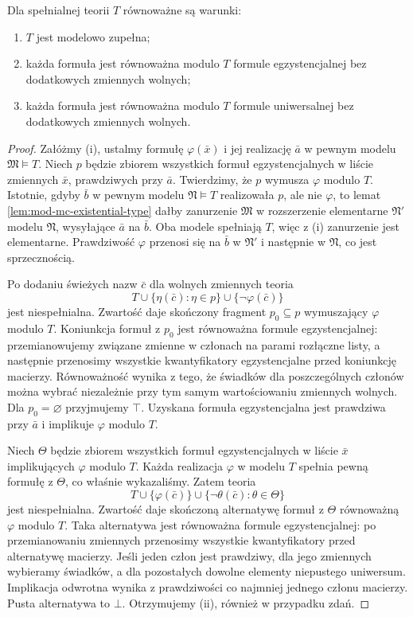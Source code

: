 \begin{twierdzenie}
\label{thm:mod-mc-existential-formulas}
Dla spełnialnej teorii $T$ równoważne są warunki:
\begin{enumerate}[label=(\roman*)]
\item $T$ jest modelowo zupełna;
\item każda formuła jest równoważna modulo $T$ formule
egzystencjalnej bez dodatkowych zmiennych wolnych;
\item każda formuła jest równoważna modulo $T$ formule
uniwersalnej bez dodatkowych zmiennych wolnych.
\end{enumerate}
\end{twierdzenie}
\begin{proof}
Załóżmy (i), ustalmy formułę $\varphi(\bar x)$
i jej realizację $\bar a$ w pewnym modelu
$\mathfrak M\models T$. Niech $p$ będzie zbiorem
wszystkich formuł egzystencjalnych w liście zmiennych
$\bar x$, prawdziwych przy $\bar a$.
Twierdzimy, że $p$ wymusza $\varphi$ modulo $T$.
Istotnie, gdyby $\bar b$ w pewnym modelu
$\mathfrak N\models T$ realizowała $p$, ale nie
$\varphi$, to lemat \ref{lem:mod-mc-existential-type}
dałby zanurzenie $\mathfrak M$ w rozszerzenie
elementarne $\mathfrak N'$ modelu $\mathfrak N$,
wysyłające $\bar a$ na $\bar b$.
Oba modele spełniają $T$, więc z (i) zanurzenie
jest elementarne. Prawdziwość $\varphi$ przenosi się
na $\bar b$ w $\mathfrak N'$ i następnie w $\mathfrak N$,
co jest sprzecznością.

Po dodaniu świeżych nazw $\bar c$ dla wolnych zmiennych
teoria
\[
T\cup\{\eta(\bar c):\eta\in p\}
\cup\{\neg\varphi(\bar c)\}
\]
jest niespełnialna. Zwartość daje skończony fragment
$p_0\subseteq p$ wymuszający $\varphi$ modulo $T$.
Koniunkcja formuł z $p_0$ jest równoważna formule
egzystencjalnej: przemianowujemy związane zmienne
w członach na parami rozłączne listy, a następnie
przenosimy wszystkie kwantyfikatory egzystencjalne
przed koniunkcję macierzy. Równoważność wynika z tego,
że świadków dla poszczególnych członów można wybrać
niezależnie przy tym samym wartościowaniu zmiennych
wolnych. Dla $p_0=\varnothing$ przyjmujemy $\top$.
Uzyskana formuła egzystencjalna jest prawdziwa
przy $\bar a$ i implikuje $\varphi$ modulo $T$.

Niech $\Theta$ będzie zbiorem wszystkich formuł
egzystencjalnych w liście $\bar x$ implikujących
$\varphi$ modulo $T$. Każda realizacja $\varphi$
w modelu $T$ spełnia pewną formułę z $\Theta$,
co właśnie wykazaliśmy. Zatem teoria
\[
T\cup\{\varphi(\bar c)\}
\cup\{\neg\theta(\bar c):\theta\in\Theta\}
\]
jest niespełnialna. Zwartość daje skończoną alternatywę
formuł z $\Theta$ równoważną $\varphi$ modulo $T$.
Taka alternatywa jest równoważna formule egzystencjalnej:
po przemianowaniu zmiennych przenosimy wszystkie
kwantyfikatory przed alternatywę macierzy.
Jeśli jeden człon jest prawdziwy, dla jego zmiennych
wybieramy świadków, a dla pozostałych dowolne
elementy niepustego uniwersum. Implikacja odwrotna
wynika z prawdziwości co najmniej jednego członu
macierzy. Pusta alternatywa to $\bot$.
Otrzymujemy (ii), również w przypadku zdań.


\end{proof}
